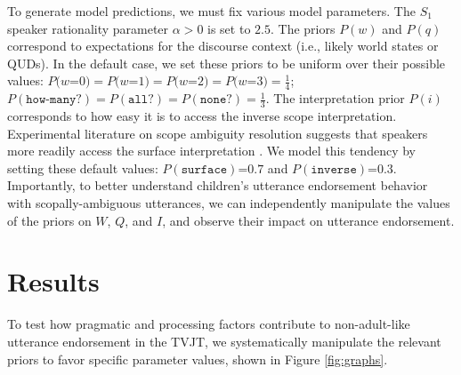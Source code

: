 \documentclass[10pt,a4paper]{article}
\newcommand{\kj}[1]{\textcolor{green}{[kj: #1]}}
\begin{document}
To generate model predictions, we must fix various model parameters. The $S_1$ speaker rationality parameter $\alpha > 0$ is set to $2.5$. The priors $P(w)$ and $P(q)$ correspond to expectations for the discourse context (i.e., likely world states or QUDs). In the default case, 
we set these priors to be uniform over their possible values: $P(w$=$0) = P(w$=$1) = P(w$=$2) = P(w$=$3) = \frac{1}{4}$; $P(\texttt{how-many?}) = P(\texttt{all?}) = P(\texttt{none?}) = \frac{1}{3}$. 
The interpretation prior $P(i)$ corresponds to how easy it is to access the inverse scope interpretation. Experimental literature on scope ambiguity resolution suggests that speakers more readily access the surface interpretation \cite{anderson2004structure,conroy2008surface}. We model this tendency by setting these default values: $P(\texttt{surface})$=$0.7$ and $P(\texttt{inverse})$=$0.3$.
Importantly, to better understand children's utterance endorsement behavior with scopally-ambiguous utterances, we can independently manipulate the values of the priors on $W$, $Q$, and $I$, and observe their impact on utterance endorsement.

\section{Results}

To test  how pragmatic and processing factors contribute to non-adult-like utterance endorsement in the TVJT, we systematically manipulate the relevant priors to favor specific parameter values, shown in Figure \ref{fig:graphs}.

\end{document}
